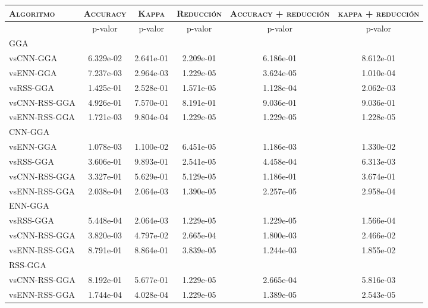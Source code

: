 \begin{table}[h!]
\centering
\begin{adjustbox}{max width =\textwidth}
\begin{tabular}{l c c c c c}
\hline
	\textsc{Algoritmo}
	& \multicolumn{1}{c}{\textsc{Accuracy}}
	& \multicolumn{1}{c}{\textsc{Kappa}}
	& \multicolumn{1}{c}{\textsc{Reducción}} 
	& \multicolumn{1}{c}{\textsc{Accuracy + reducción}} 
	& \multicolumn{1}{c}{\textsc{kappa + reducción}} \\
\hline
\hline

 & p-valor & p-valor & p-valor & p-valor & p-valor \\

GGA\\
vsCNN-GGA  & 6.329e-02 & 2.641e-01 & 2.209e-01 & 6.186e-01 & 8.612e-01 \\   
vsENN-GGA  & 7.237e-03 & 2.964e-03 & 1.229e-05 & 3.624e-05 & 1.010e-04 \\  
vsRSS-GGA  & 1.425e-01 & 2.528e-01 & 1.571e-05 & 1.128e-04 & 2.062e-03 \\    
vsCNN-RSS-GGA & 4.926e-01 & 7.570e-01 & 8.191e-01 & 9.036e-01 & 9.036e-01 \\
vsENN-RSS-GGA & 1.721e-03 & 9.804e-04 & 1.229e-05 & 1.229e-05 & 1.228e-05 \\

\hline

CNN-GGA\\
vsENN-GGA & 1.078e-03 & 1.100e-02 & 6.451e-05 & 1.186e-03 & 1.330e-02 \\
vsRSS-GGA & 3.606e-01 & 9.893e-01 & 2.541e-05 & 4.458e-04 & 6.313e-03 \\
vsCNN-RSS-GGA & 3.327e-01 & 5.629e-01 & 5.129e-05 & 1.186e-01 & 3.674e-01 \\ 
vsENN-RSS-GGA & 2.038e-04 & 2.064e-03 & 1.390e-05 & 2.257e-05 & 2.958e-04 \\ 

\hline

ENN-GGA\\
vsRSS-GGA & 5.448e-04 & 2.064e-03 & 1.229e-05 & 1.229e-05 & 1.566e-04 \\ 
vsCNN-RSS-GGA & 3.820e-03 & 4.797e-02 & 2.665e-04 & 1.800e-03 & 2.466e-02 \\
vsENN-RSS-GGA & 8.791e-01 & 8.864e-01 & 3.839e-05 & 1.244e-03 & 1.855e-02 \\ 

\hline

RSS-GGA\\
vsCNN-RSS-GGA & 8.192e-01 & 5.677e-01 & 1.229e-05 & 2.665e-04 & 5.816e-03 \\
vsENN-RSS-GGA  & 1.744e-04 & 4.028e-04 & 1.229e-05 & 1.389e-05 & 2.543e-05 \\


\end{tabular}
\end{adjustbox}
\end{table}
